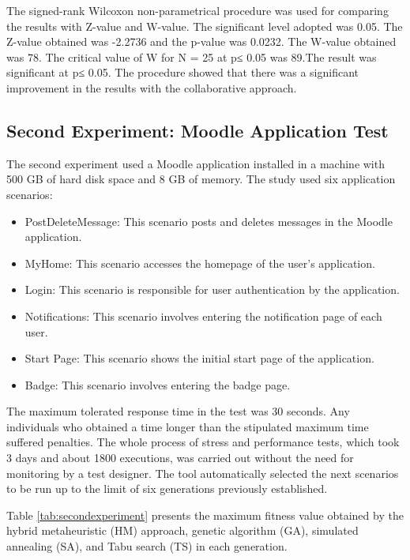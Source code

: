 \documentclass[conference]{IEEEtran}
\begin{document}
The signed-rank Wilcoxon non-parametrical procedure was used for comparing the results with Z-value and W-value. The significant level adopted was 0.05. The Z-value obtained was -2.2736 and the p-value was 0.0232. The W-value obtained was 78. The critical value of W for N = 25 at p≤ 0.05 was 89.The result was significant at p≤ 0.05. The procedure showed that there was a significant improvement in the results with the collaborative approach.

\subsection{Second Experiment: Moodle Application Test}

The second experiment used a Moodle application installed in a machine with 500 GB of hard disk space and 8 GB of memory. The study used six application scenarios:

\begin{itemize}
\item PostDeleteMessage: This scenario posts and deletes messages in the Moodle application.
\item MyHome: This scenario accesses the homepage of the user's application.
\item Login: This scenario is responsible for user authentication by the application.
\item Notifications: This scenario involves entering the notification page of each user.
\item Start Page: This scenario shows the initial start page of the application.
\item Badge: This scenario involves entering the badge page.
\end{itemize}

The maximum tolerated response time in the test was 30 seconds.  Any  individuals who obtained a time longer than the stipulated maximum time suffered penalties.  The whole process of stress and performance tests, which took 3 days and about 1800 executions, was carried out without the need for monitoring by a test designer. The tool automatically selected the next scenarios to be run up to the limit of six generations previously established. 

Table \ref{tab:secondexperiment} presents the maximum fitness value obtained by the hybrid metaheuristic (HM) approach, genetic algorithm (GA), simulated annealing (SA), and Tabu search (TS) in each generation. 
\end{document}
